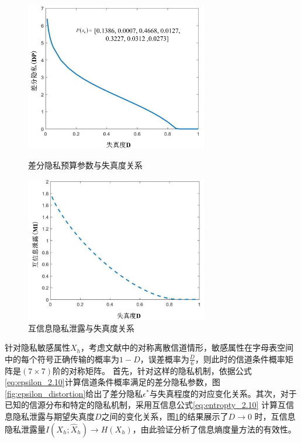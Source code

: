 \begin{figure}[htbp]
	\centering
	\begin{minipage}[t]{0.48\textwidth}
		\centering
		\includegraphics[width=8cm]{./figures/chapter03/Figure2.png}
		\caption{差分隐私预算参数与失真度关系}
		\label{fig:epsilon_distortion}
	\end{minipage}
	\begin{minipage}[t]{0.48\textwidth}
		\centering
		\includegraphics[width=8cm]{./figures/chapter03/Figure3.png}
		\caption{互信息隐私泄露与失真度关系}
		\label{fig:mi_distortion}
	\end{minipage}
\end{figure}

针对隐私敏感属性$X_h$，考虑文献中的对称离散信道情形，敏感属性在字母表空间中的每个符号正确传输的概率为$1-D$，误差概率为$\frac{D}{6}$，则此时的信道条件概率矩阵是$(7\times7)$阶的对称矩阵。 首先，针对这样的隐私机制，依据公式\ref{eq:epsilon_2.10}计算信道条件概率满足的差分隐私参数，图\ref{fig:epsilon_distortion}给出了差分隐私$\epsilon^{*}$与失真程度的对应变化关系。其次，对于已知的信源分布和特定的隐私机制，采用互信息公式\ref{eq:entropty_2.10} 计算互信息隐私泄露与期望失真度$D$之间的变化关系，图\ref{fig:mi_distortion}的结果展示了$D\rightarrow 0$ 时，互信息隐私泄露量$I(X_h;\hat{X}_h)\rightarrow H(X_h)$，由此验证分析了信息熵度量方法的有效性。



